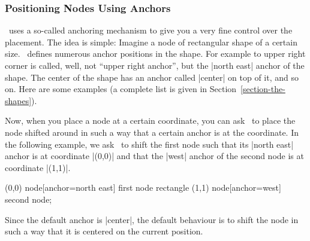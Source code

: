 \subsubsection{Positioning Nodes Using Anchors}

\pgfname\ uses a so-called anchoring mechanism to give you a very fine control
over the placement. The idea is simple: Imagine a node of rectangular shape of
a certain size. \pgfname\ defines numerous anchor positions in the shape. For
example to upper right corner is called, well, not ``upper right anchor'', but
the |north east| anchor of the shape. The center of the shape has an anchor
called |center| on top of it, and so on. Here are some examples (a complete
list is given in Section~\ref{section-the-shapes}).

\medskip\noindent
{}

Now, when you place a node at a certain coordinate, you can ask \tikzname\ to
place the node shifted around in such a way that a certain anchor is at the
coordinate. In the following example, we ask \tikzname\ to shift the first node
such that its  |north east| anchor is at coordinate |(0,0)| and that the |west|
anchor of the second node is at coordinate |(1,1)|.
%
\begin{codeexample}[]
\tikz \draw           (0,0) node[anchor=north east] {first node}
            rectangle (1,1) node[anchor=west] {second node};
\end{codeexample}

Since the default anchor is |center|, the default behaviour is to shift the
node in such a way that it is centered on the current position.

